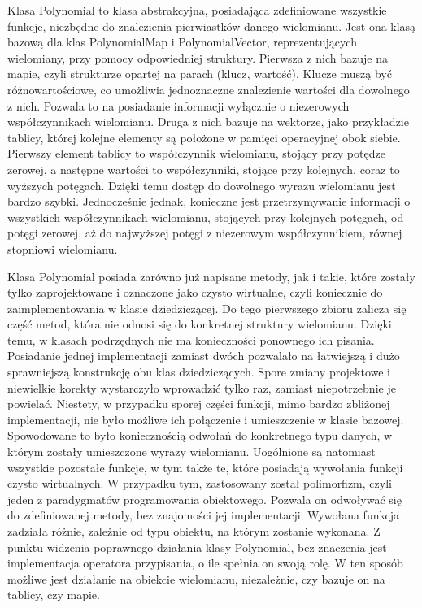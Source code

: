 \documentclass[twoside,a4paper]{book}
\begin{document}
Klasa Polynomial to klasa abstrakcyjna, posiadająca zdefiniowane wszystkie funkcje, niezbędne do znalezienia pierwiastków danego wielomianu. Jest ona klasą bazową dla klas PolynomialMap i PolynomialVector, reprezentujących wielomiany, przy pomocy odpowiedniej struktury. Pierwsza z nich bazuje na mapie, czyli strukturze opartej na parach (klucz, wartość). Klucze muszą być różnowartościowe, co umożliwia jednoznaczne znalezienie wartości dla dowolnego z nich. Pozwala to na posiadanie informacji wyłącznie o niezerowych współczynnikach wielomianu. Druga z nich bazuje na wektorze, jako przykładzie tablicy, której kolejne elementy są położone w pamięci operacyjnej obok siebie. Pierwszy element tablicy to współczynnik wielomianu, stojący przy potędze zerowej, a następne wartości to współczynniki, stojące przy kolejnych, coraz to wyższych potęgach. Dzięki temu dostęp do dowolnego wyrazu wielomianu jest bardzo szybki. Jednocześnie jednak, konieczne jest przetrzymywanie informacji o wszystkich współczynnikach wielomianu, stojących przy kolejnych potęgach, od potęgi zerowej, aż do najwyższej potęgi z niezerowym współczynnikiem, równej stopniowi wielomianu.

Klasa Polynomial posiada zarówno już napisane metody, jak i takie, które zostały tylko zaprojektowane i oznaczone jako czysto wirtualne, czyli koniecznie do zaimplementowania w klasie dziedziczącej. Do tego pierwszego zbioru zalicza się część metod, która nie odnosi się do konkretnej struktury wielomianu. Dzięki temu, w klasach podrzędnych nie ma konieczności ponownego ich pisania. Posiadanie jednej implementacji zamiast dwóch pozwalało na łatwiejszą i dużo sprawniejszą konstrukcję obu klas dziedziczących. Spore zmiany projektowe i niewielkie korekty wystarczyło wprowadzić tylko raz, zamiast niepotrzebnie je powielać. Niestety, w przypadku sporej części funkcji, mimo bardzo zbliżonej implementacji, nie było możliwe ich połączenie i umieszczenie w klasie bazowej. Spowodowane to było koniecznością odwołań do konkretnego typu danych, w którym zostały umieszczone wyrazy wielomianu. Uogólnione są natomiast wszystkie pozostałe funkcje, w tym także te, które posiadają wywołania funkcji czysto wirtualnych. W przypadku tym, zastosowany został polimorfizm, czyli jeden z paradygmatów programowania obiektowego. Pozwala on odwoływać się do zdefiniowanej metody, bez znajomości jej implementacji. Wywołana funkcja zadziała różnie, zależnie od typu obiektu, na którym zostanie wykonana. Z punktu widzenia poprawnego działania klasy Polynomial, bez znaczenia jest implementacja operatora przypisania, o ile spełnia on swoją rolę. W ten sposób możliwe jest działanie na obiekcie wielomianu, niezależnie, czy bazuje on na tablicy, czy mapie.
\end{document}
